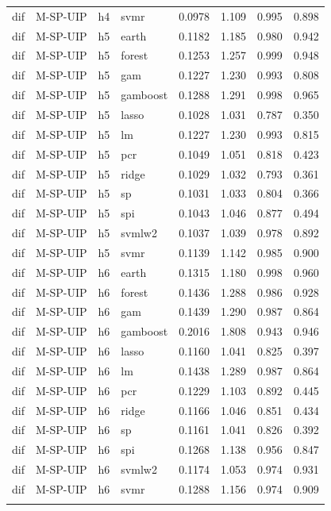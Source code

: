 \begin{ThreePartTable}
\begin{longtable}[t]{llclcccc}
dif & M-SP-UIP & h4 & svmr & 0.0978 & 1.109 & 0.995 & 0.898\\
\addlinespace
dif & M-SP-UIP & h5 & earth & 0.1182 & 1.185 & 0.980 & 0.942\\
dif & M-SP-UIP & h5 & forest & 0.1253 & 1.257 & 0.999 & 0.948\\
dif & M-SP-UIP & h5 & gam & 0.1227 & 1.230 & 0.993 & 0.808\\
dif & M-SP-UIP & h5 & gamboost & 0.1288 & 1.291 & 0.998 & 0.965\\
dif & M-SP-UIP & h5 & lasso & 0.1028 & 1.031 & 0.787 & 0.350\\
dif & M-SP-UIP & h5 & lm & 0.1227 & 1.230 & 0.993 & 0.815\\
dif & M-SP-UIP & h5 & pcr & 0.1049 & 1.051 & 0.818 & 0.423\\
dif & M-SP-UIP & h5 & ridge & 0.1029 & 1.032 & 0.793 & 0.361\\
dif & M-SP-UIP & h5 & sp & 0.1031 & 1.033 & 0.804 & 0.366\\
dif & M-SP-UIP & h5 & spi & 0.1043 & 1.046 & 0.877 & 0.494\\
dif & M-SP-UIP & h5 & svmlw2 & 0.1037 & 1.039 & 0.978 & 0.892\\
dif & M-SP-UIP & h5 & svmr & 0.1139 & 1.142 & 0.985 & 0.900\\
\addlinespace
dif & M-SP-UIP & h6 & earth & 0.1315 & 1.180 & 0.998 & 0.960\\
dif & M-SP-UIP & h6 & forest & 0.1436 & 1.288 & 0.986 & 0.928\\
dif & M-SP-UIP & h6 & gam & 0.1439 & 1.290 & 0.987 & 0.864\\
dif & M-SP-UIP & h6 & gamboost & 0.2016 & 1.808 & 0.943 & 0.946\\
dif & M-SP-UIP & h6 & lasso & 0.1160 & 1.041 & 0.825 & 0.397\\
dif & M-SP-UIP & h6 & lm & 0.1438 & 1.289 & 0.987 & 0.864\\
dif & M-SP-UIP & h6 & pcr & 0.1229 & 1.103 & 0.892 & 0.445\\
dif & M-SP-UIP & h6 & ridge & 0.1166 & 1.046 & 0.851 & 0.434\\
dif & M-SP-UIP & h6 & sp & 0.1161 & 1.041 & 0.826 & 0.392\\
dif & M-SP-UIP & h6 & spi & 0.1268 & 1.138 & 0.956 & 0.847\\
dif & M-SP-UIP & h6 & svmlw2 & 0.1174 & 1.053 & 0.974 & 0.931\\
dif & M-SP-UIP & h6 & svmr & 0.1288 & 1.156 & 0.974 & 0.909\\
\addlinespace

\end{longtable}
\end{ThreePartTable}
